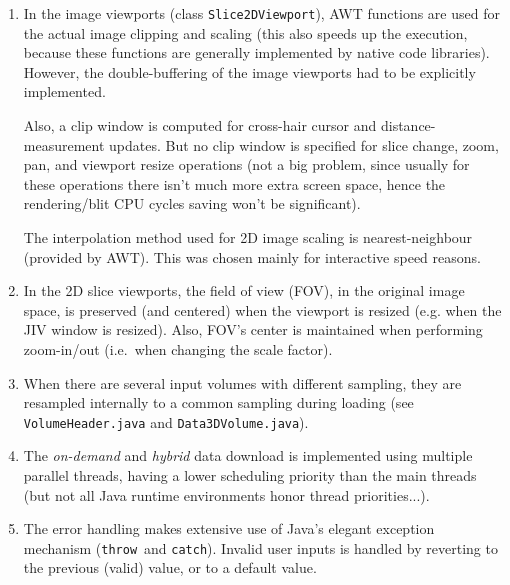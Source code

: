 \documentclass[11pt]{article}
\begin{document}
\begin{enumerate}
\item In the image viewports (class \texttt{Slice2DViewport}), AWT
  functions are used for the actual image clipping and scaling (this
  also speeds up the execution, because these functions are generally
  implemented by native code libraries). However, the double-buffering
  of the image viewports had to be explicitly implemented.
  
  Also, a clip window is computed for cross-hair cursor and
  distance-measurement updates. But no clip window is specified for
  slice change, zoom, pan, and viewport resize operations (not a big
  problem, since usually for these operations there isn't much more
  extra screen space, hence the rendering/blit CPU cycles saving won't
  be significant).
  
  The interpolation method used for 2D image scaling is
  nearest-neighbour (provided by AWT). This was chosen mainly for
  interactive speed reasons.
  
\item In the 2D slice viewports, the field of view (FOV), in the
  original image space, is preserved (and centered) when the viewport
  is resized (e.g. when the JIV window is resized). Also, FOV's center
  is maintained when performing zoom-in/out (i.e.\ when changing the
  scale factor).

\item When there are several input volumes with different sampling,
  they are resampled internally to a common sampling during loading (see
  \texttt{VolumeHeader.java} and \texttt{Data3DVolume.java}).

\item The \emph{on-demand} and \emph{hybrid} data download is
  implemented using multiple parallel threads, having a lower
  scheduling priority than the main threads (but not all Java
  runtime environments honor thread priorities...).
  
\item The error handling makes extensive use of Java's elegant
  exception mechanism (\verb+throw+\ and \verb+catch+). Invalid user
  inputs is handled by reverting to the previous (valid) value, or to
  a default value.


\end{enumerate}
\end{document}
